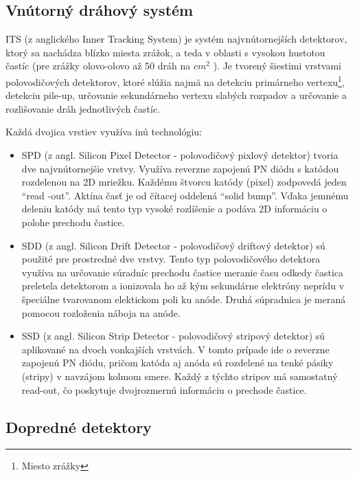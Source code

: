 \documentclass[thesismargins, thesislinespacing]{rnthesis}
\begin{document}
\subsection{Vnútorný dráhový systém}

ITS (z anglického Inner Tracking System) je systém najvnútornejších detektorov, ktorý sa nachádza blízko miesta zrážok, a teda v oblasti s vysokou hustotou častíc (pre zrážky olovo-olovo až 50 dráh na $cm^2$ ). Je tvorený šiestimi vrstvami polovodičových detektorov, ktoré slúžia najmä na detekciu primárneho vertexu\footnote{Miesto zrážky}, detekciu pile-up, určovanie sekundárneho vertexu slabých rozpadov a určovanie a rozlišovanie dráh jednotlivých častíc. 

Každá dvojica vrstiev využíva inú technológiu:
\begin{itemize}
	\item SPD (z angl. Silicon Pixel Detector - polovodičový pixlový detektor) tvoria dve najvnútornejšie vrstvy. Využíva reverzne zapojenú PN diódu s katódou rozdelenou na 2D mriežku. Každému štvorcu katódy (pixel) zodpovedá jeden “read -out”. Aktína časť je od čítacej oddelená “solid bump”. Vďaka jemnému deleniu katódy má tento typ vysoké rozlíšenie a podáva 2D informáciu o polohe prechodu častice. 
	\item SDD (z angl. Silicon Drift Detector - polovodičový driftový detektor) sú použité pre prostredné dve vrstvy. Tento typ polovodičového detektora využíva na určovanie súradníc prechodu častice meranie času odkedy častica preletela detektorom a ionizovala ho až kým sekundárne elektróny neprídu v špeciálne tvarovanom elektickom poli ku anóde. Druhá súpradnica je meraná pomocou rozloženia náboja na anóde.
	\item SSD (z angl. Silicon Strip Detector - polovodičový stripový detektor) sú aplikované na dvoch vonkajších vrstvách. V tomto prípade ide o reverzne zapojenú PN diódu, pričom katóda aj anóda sú rozdelené na tenké pásiky (stripy) v navzájom kolmom smere. Každý z týchto stripov má samostatný read-out, čo poskytuje dvojrozmernú informáciu o prechode častice. 
\end{itemize}
\subsection{Dopredné detektory}
\end{document}
